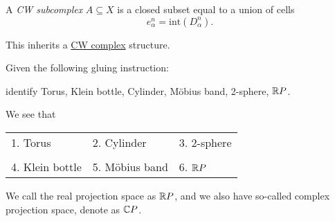 \begin{definition}[CW subcomplex]\label{def:CW-subcomplex}
	A \emph{CW subcomplex} \(A\subseteq X\) is a closed subset equal to a union of cells
	\[
		e^n_{\alpha} = \mathrm{int}\left(D^n_{\alpha}\right).
	\]
\end{definition}
\begin{remark}
	This inherits a \hyperref[def:CW-Complex]{CW complex} structure.
\end{remark}

\begin{exercise}
	Given the following gluing instruction:
	\begin{figure}[H]
		\centering
		\label{fig:ex:CW-complex-gluing}
	\end{figure}
	identify Torus, Klein bottle, Cylinder, Möbius band, 2-sphere, \(\mathbb{\MakeUppercase{R}} P\).

	\begin{answer}
		We see that
		\begin{table}[H]
			\centering
			\begin{tabular}{lll}
				1. Torus        & 2. Cylinder    & 3. 2-sphere                                 \\\\
				4. Klein bottle & 5. Möbius band & 6.         \(\mathbb{\MakeUppercase{R}} P\) \\
			\end{tabular}
		\end{table}
	\end{answer}
	\begin{notation}
		We call the real projection space as \(\mathbb{\MakeUppercase{R}} P\), and we also have so-called
		complex projection space, denote as \(\mathbb{\MakeUppercase{C}} P\).
	\end{notation}
\end{exercise}
